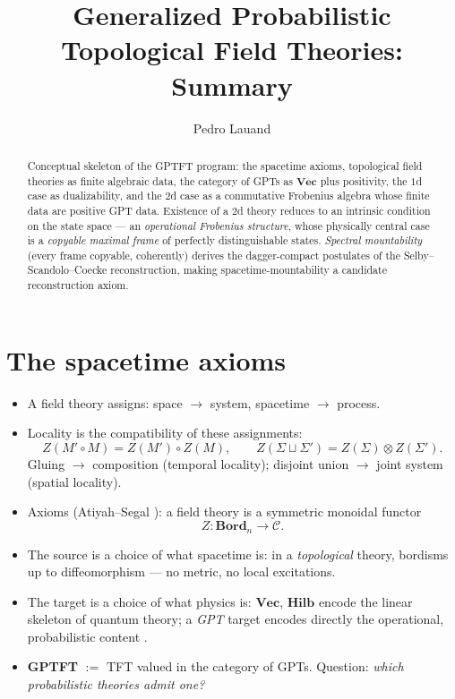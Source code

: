 \documentclass[prl,aps,10pt,superscriptaddress,floatfix]{revtex4-2}
\begin{document}
\title{Generalized Probabilistic Topological Field Theories: Summary}
\author{Pedro Lauand}

\begin{abstract}
Conceptual skeleton of the GPTFT program: the spacetime axioms, topological field theories as finite algebraic data, the category of GPTs as $\mathbf{Vec}$ plus positivity, the $1$d case as dualizability, and the $2$d case as a commutative Frobenius algebra whose finite data are positive GPT data. Existence of a $2$d theory reduces to an intrinsic condition on the state space --- an \emph{operational Frobenius structure}, whose physically central case is a \emph{copyable maximal frame} of perfectly distinguishable states. \emph{Spectral mountability} (every frame copyable, coherently) derives the dagger-compact postulates of the Selby--Scandolo--Coecke reconstruction, making spacetime-mountability a candidate reconstruction axiom.
\end{abstract}

\maketitle

\section{The spacetime axioms}\label{sec:intro}

\begin{itemize}
\item A field theory assigns: space $\to$ system, spacetime $\to$ process.
\item Locality is the compatibility of these assignments:
\[
Z(M'\circ M)=Z(M')\circ Z(M),\qquad
Z(\Sigma\sqcup\Sigma')=Z(\Sigma)\otimes Z(\Sigma').
\]
Gluing $\to$ composition (temporal locality); disjoint union $\to$ joint system (spatial locality).
\item Axioms (Atiyah--Segal \cite{Atiyah1988,Segal2004}): a field theory is a symmetric monoidal functor
\[
Z:\mathbf{Bord}_n\longrightarrow\mathcal C .
\]
\item The source is a choice of what spacetime is: in a \emph{topological} theory, bordisms up to diffeomorphism --- no metric, no local excitations.
\item The target is a choice of what physics is: $\mathbf{Vec}$, $\mathbf{Hilb}$ encode the linear skeleton of quantum theory; a \emph{GPT} target encodes directly the operational, probabilistic content \cite{Hardy2001,Barrett2007,Mueller2021,Plavala2023}.
\item \textbf{GPTFT} $:=$ TFT valued in the category of GPTs. Question: \emph{which probabilistic theories admit one?}
\end{itemize}
\end{document}
